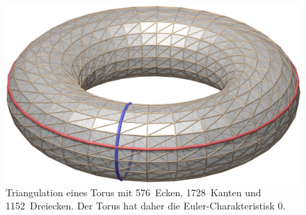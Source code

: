 %
%
%
\begin{figure}
\centering
\includegraphics[width=\textwidth]{chapters/120-topologie/images/torus.jpg}
\caption{Triangulation eines Torus mit 576~Ecken, 1728~Kanten und
1152~Dreiecken.
Der Torus hat daher die Euler-Charakteristisk $0$.
\label{buch:topologie:intro:fig:torus}}
\end{figure}
